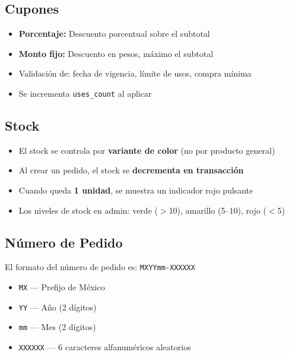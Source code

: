 \documentclass[12pt, a4paper]{article}
\begin{document}
\subsection{Cupones}

\begin{itemize}[nosep]
    \item \textbf{Porcentaje:} Descuento porcentual sobre el subtotal
    \item \textbf{Monto fijo:} Descuento en pesos, m\'{a}ximo el subtotal
    \item Validaci\'{o}n de: fecha de vigencia, l\'{i}mite de usos, compra m\'{i}nima
    \item Se incrementa \texttt{uses\_count} al aplicar
\end{itemize}

\subsection{Stock}

\begin{itemize}[nosep]
    \item El stock se controla por \textbf{variante de color} (no por producto general)
    \item Al crear un pedido, el stock se \textbf{decrementa en transacci\'{o}n}
    \item Cuando queda \textbf{1 unidad}, se muestra un indicador rojo pulsante
    \item Los niveles de stock en admin: {\textcolor{mxgreen}{verde}} ($>$10), {\textcolor{mxorange}{amarillo}} (5--10), {\textcolor{mxred}{rojo}} ($<$5)
\end{itemize}

\subsection{N\'{u}mero de Pedido}

El formato del n\'{u}mero de pedido es: \texttt{MXYYmm-XXXXXX}

\begin{itemize}[nosep]
    \item \texttt{MX} --- Prefijo de M\'{e}xico
    \item \texttt{YY} --- A\~{n}o (2 d\'{i}gitos)
    \item \texttt{mm} --- Mes (2 d\'{i}gitos)
    \item \texttt{XXXXXX} --- 6 caracteres alfanum\'{e}ricos aleatorios
\end{itemize}
\end{document}
